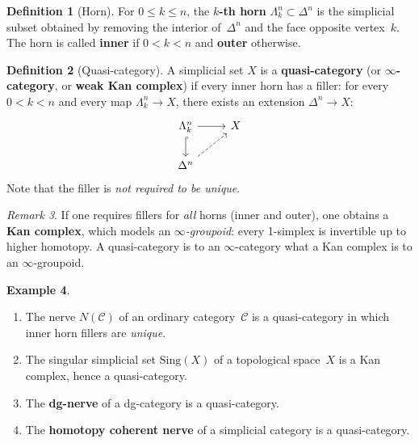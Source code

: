 \documentclass[a4paper,12pt]{book}
\theoremstyle{definition}
\newtheorem{definition}{Definition}[section]
\newtheorem{example}[definition]{Example}
\theoremstyle{plain}
\theoremstyle{remark}
\newtheorem{remark}[definition]{Remark}
\begin{document}
\begin{definition}[Horn]\label{def:horn}
For $0\le k\le n$, the \textbf{$k$-th horn} $\Lambda^n_k\subset\Delta^n$
is the simplicial subset obtained by removing the interior of~$\Delta^n$
and the face opposite vertex~$k$.  The horn is called \textbf{inner} if
$0 < k < n$ and \textbf{outer} otherwise.
\end{definition}

\begin{definition}[Quasi-category]\label{def:quasi-category}
A simplicial set $X$ is a \textbf{quasi-category} (or \textbf{$\infty$-category},
or \textbf{weak Kan complex}) if every inner horn has a filler:
for every $0 < k < n$ and every map $\Lambda^n_k\to X$, there exists
an extension $\Delta^n\to X$:
\[
\begin{tikzcd}
\Lambda^n_k \arrow[r] \arrow[d, hook] & X \\
\Delta^n \arrow[ur, dashed] &
\end{tikzcd}
\]
Note that the filler is \emph{not required to be unique}.
\end{definition}

\begin{remark}\label{rem:kan-vs-quasi}
If one requires fillers for \emph{all} horns (inner and outer), one
obtains a \textbf{Kan complex}, which models an \emph{$\infty$-groupoid}:
every 1-simplex is invertible up to higher homotopy.  A quasi-category
is to an $\infty$-category what a Kan complex is to an $\infty$-groupoid.
\end{remark}

\begin{example}\label{ex:quasi-cat-examples}
\begin{enumerate}[label=(\roman*)]
\item The nerve $N(\mathcal{C})$ of an ordinary category~$\mathcal{C}$ is
      a quasi-category in which inner horn fillers are \emph{unique}.
\item The singular simplicial set $\mathrm{Sing}(X)$ of a topological
      space~$X$ is a Kan complex, hence a quasi-category.
\item The \textbf{dg-nerve} of a dg-category is a quasi-category.
\item The \textbf{homotopy coherent nerve} of a simplicial category is a
      quasi-category.
\end{enumerate}
\end{example}
\end{document}
